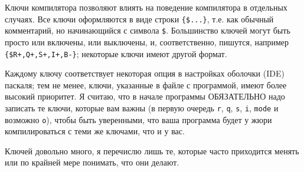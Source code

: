 
Ключи компилятора позволяют влиять на поведение компилятора в отдельных случаях. Все ключи 
оформляются в виде строки \verb|{$...}|, т.е. как обычный комментарий, но начинающийся с символа 
\verb|$|. Большинство ключей могут быть просто или включены, или выключены, и, соответственно, 
пишутся, например \verb|{$R+,Q+,S+,I+,B-}|; некоторые ключи имеют другой формат.

Каждому ключу соответствует некоторая опция в настройках оболочки (IDE) паскаля; тем не менее, 
ключи, указанные в файле с программой, имеют более высокий приоритет. Я считаю, что в начале программы ОБЯЗАТЕЛЬНО 
надо записать те ключи, которые вам важны (в первую очередь \verb|r|, \verb|q|, \verb|s|, \verb|i|, 
\verb|mode| и возможно \verb|o|), чтобы быть уверенными, что ваша программа  
будет у жюри компилироваться с теми же ключами, что и у вас.

Ключей довольно много, я перечислю лишь те, которые часто приходится менять или по крайней мере понимать, что они делают.

